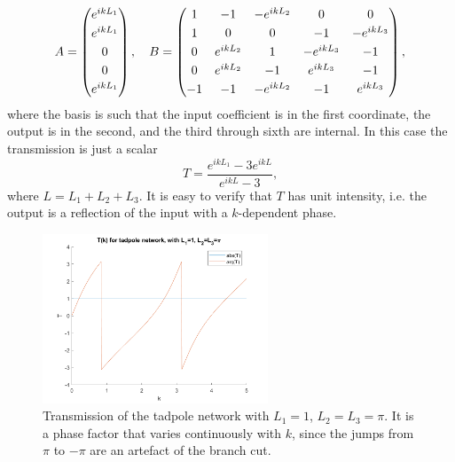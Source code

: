 \begin{equation}
    \label{eq:AB_tadpole}
    \hspace{-3cm}
    A = \begin{pmatrix}
        e^{ikL_1}  \\[0.3em]
        e^{ikL_1}  \\[0.3em]
        0          \\[0.3em]
        0          \\[0.3em]
        e^{ikL_1}   \end{pmatrix}, 
      \quad
    B = \begin{pmatrix}
    1 & -1 & -e^{ikL_2} & 0 & 0 \\[0.3em]
    1 & 0 & 0 & -1 & -e^{ikL_3} \\[0.3em]
    0 & e^{ikL_2} & 1 & -e^{ikL_3} & -1 \\[0.3em]
    0 & e^{ikL_2} & -1 & e^{ikL_3} & -1 \\[0.3em]
    -1 & -1 & -e^{ikL_2} & -1 & e^{ikL_3} 
     \end{pmatrix},
     \hspace{-3cm}
\end{equation}
where the basis is such that the input coefficient is in the first coordinate, the output is in the second, and the third through sixth are internal. In this case the transmission is just a scalar
\begin{equation}
    \label{eq:T_tadpole}
    T=\frac{e^{ikL_1}-3e^{ikL}}{e^{ikL}-3},
\end{equation}
where $L=L_1+L_2+L_3$. It is easy to verify that $T$ has unit intensity, i.e. the output is a reflection of the input with a $k$-dependent phase.
\begin{figure}[h]
  \centering
    \includegraphics[width=0.6\textwidth]{ch2/fig2/tadpole_T.png}
    \caption{Transmission of the tadpole network with $L_1=1$, $L_2=L_3=\pi$. It is a phase factor that varies continuously with $k$, since the jumps from $\pi$ to $-\pi$ are an artefact of the branch cut.}
    \label{fig:T_tadpole}
\end{figure}


